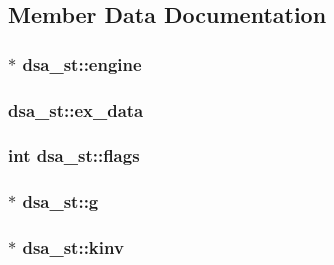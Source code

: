 \subsection{Member Data Documentation}
\subsubsection[{\texorpdfstring{engine}{engine}}]{$\ast$ dsa\+\_\+st\+::engine}\hypertarget{structdsa__st_a0cfa8000f47729c5eb6cc2053eb01b75}{}\label{structdsa__st_a0cfa8000f47729c5eb6cc2053eb01b75}
\subsubsection[{\texorpdfstring{ex\+\_\+data}{ex_data}}]{ dsa\+\_\+st\+::ex\+\_\+data}\hypertarget{structdsa__st_a0def4851606ac230c65f4409de2c0c71}{}\label{structdsa__st_a0def4851606ac230c65f4409de2c0c71}
\subsubsection[{\texorpdfstring{flags}{flags}}]{\setlength{\rightskip}{0pt plus 5cm}int dsa\+\_\+st\+::flags}\hypertarget{structdsa__st_a3c27d330e3e07368715455b5a019690d}{}\label{structdsa__st_a3c27d330e3e07368715455b5a019690d}
\subsubsection[{\texorpdfstring{g}{g}}]{$\ast$ dsa\+\_\+st\+::g}\hypertarget{structdsa__st_af5ec97a996fd695c0186eb5a9a2b0b38}{}\label{structdsa__st_af5ec97a996fd695c0186eb5a9a2b0b38}
\subsubsection[{\texorpdfstring{kinv}{kinv}}]{$\ast$ dsa\+\_\+st\+::kinv}\hypertarget{structdsa__st_a73b0fb2db5b8546f779cb157b18f19fc}{}\label{structdsa__st_a73b0fb2db5b8546f779cb157b18f19fc}
